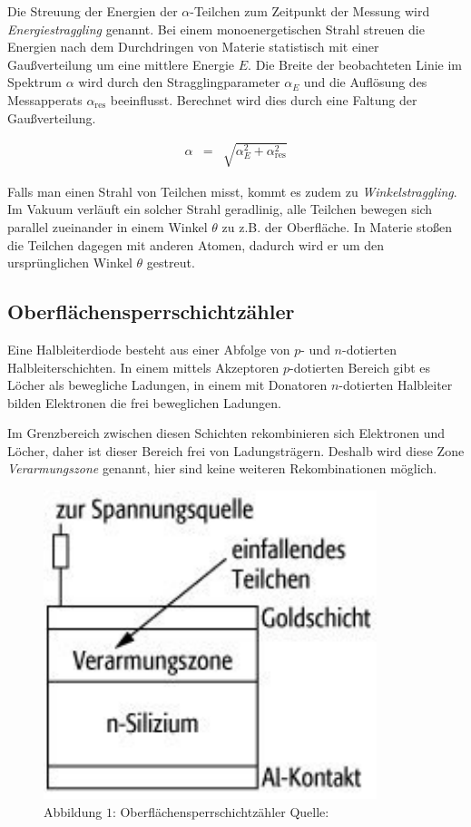 \documentclass[12pt,a4paper]{scrartcl}
\numberwithin{equation}{section} %
\begin{document}
Die Streuung der Energien der $\alpha$-Teilchen zum Zeitpunkt der Messung wird \emph{Energiestraggling} genannt. Bei einem monoenergetischen Strahl streuen die Energien nach dem Durchdringen von Materie statistisch mit einer Gaußverteilung um eine mittlere Energie $E$. Die Breite der beobachteten Linie im Spektrum $\alpha$ wird durch den Stragglingparameter $\alpha_E$ und die Auflösung des Messapperats $\alpha_\mathrm{res}$ beeinflusst. Berechnet wird dies durch eine Faltung der Gaußverteilung.

\begin{eqnarray}
    \alpha &=& \sqrt{\alpha_E^2 + \alpha_\mathrm{res}^2} \label{eq:straggling parameter}
\end{eqnarray}

Falls man einen Strahl von Teilchen misst, kommt es zudem zu \emph{Winkelstraggling}. Im Vakuum verläuft ein solcher Strahl geradlinig, alle Teilchen bewegen sich parallel zueinander in einem Winkel $\theta$ zu z.B. der Oberfläche. In Materie stoßen die Teilchen dagegen mit anderen Atomen, dadurch wird er um den ursprünglichen Winkel $\theta$ gestreut.

\hypertarget{oberfluxe4chensperrschichtzuxe4hler}{%
\subsection{Oberflächensperrschichtzähler}\label{oberfluxe4chensperrschichtzuxe4hler}}

Eine Halbleiterdiode besteht aus einer Abfolge von $p$- und $n$-dotierten Halbleiterschichten. In einem mittels Akzeptoren $p$-dotierten Bereich gibt es Löcher als bewegliche Ladungen, in einem mit Donatoren $n$-dotierten Halbleiter bilden Elektronen die frei beweglichen Ladungen.

Im Grenzbereich zwischen diesen Schichten rekombinieren sich Elektronen und Löcher, daher ist dieser Bereich frei von Ladungsträgern. Deshalb wird diese Zone \emph{Verarmungszone} genannt, hier sind keine weiteren Rekombinationen möglich.

\begin{figure}[h!]
	\centering
	\includegraphics{../media/B3.3/Oberflaechensperrschichtzaehler.pdf}
	\caption{Abbildung $1$: Oberflächensperrschichtzähler Quelle: \cite{SpektrumOberfl.Zähler}}
\end{figure}
\end{document}
